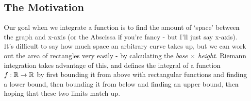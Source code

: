 \subsection{The Motivation}

Our goal when we integrate a function is to find the amount of `space' between the graph and x-axis (or the Abscissa if you're fancy - but I'll just say x-axis). It's difficult to say how much space an arbitrary curve takes up, but we can work out the area of rectangles very easily - by calculating the {\em base $\times$ height}. Riemann integration takes advantage of this, and defines the integral of a function $f:\mathbb{R} \rightarrow \mathbb{R}$ by first bounding it from above with rectangular functions and finding a lower bound, then bounding it from below and finding an upper bound, then hoping that these two limits match up. 

